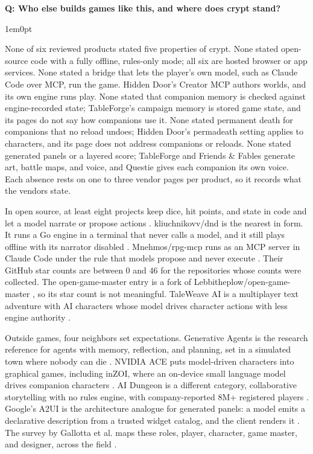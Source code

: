 \documentclass[11pt,letterpaper]{article}
\newcounter{faqnum}
\newenvironment{faqpair}[1]{%
  \needspace{4\baselineskip}\vspace{0.5em}\refstepcounter{faqnum}%
  \noindent\textbf{\color{SectionBlue}Q\thefaqnum: #1}\par\nopagebreak[4]%
  \vspace{0.2em}\begin{adjustwidth}{1em}{0pt}\setlength{\parindent}{0pt}%
}{\end{adjustwidth}\vspace{0.5em}}
\begin{document}
\begin{faqpair}{Who else builds games like this, and where does crypt stand?}
None of six reviewed products stated five properties of crypt. None stated
open-source code with a fully offline, rules-only mode; all six are hosted
browser or app services. None stated a bridge that lets the player's own
model, such as Claude Code over MCP, run the game. Hidden Door's Creator
MCP authors worlds, and its own engine runs play. None stated that
companion memory is checked against engine-recorded state; TableForge's
campaign memory is stored game state, and its pages do not say how
companions use it. None stated permanent death for companions that no
reload undoes; Hidden Door's permadeath setting applies to characters, and
its page does not address companions or reloads. None stated generated
panels or a layered score; TableForge and Friends \& Fables generate art,
battle maps, and voice, and Questie gives each companion its own voice.
Each absence rests on one to three vendor pages per product, so it records
what the vendors state.

In open source, at least eight projects keep dice, hit points, and state in
code and let a model narrate or propose actions
\cite{kliuchnikovv2026dnd,mnehmos2026rpgmcp,thegreystone2026rpgmcp,shadowgate152026dungeonmaster,slowbutfast2026opendungeon,alecvlad2026opengamemaster,datashaman2026aittrpg,undergroundrap2026aimud}.
kliuchnikovv/dnd is the nearest in form. It runs a Go engine in a terminal
that never calls a model, and it still plays offline with its narrator
disabled \cite{kliuchnikovv2026dnd}. Mnehmos/rpg-mcp runs as an MCP server
in Claude Code under the rule that models propose and never execute
\cite{mnehmos2026rpgmcp}. Their GitHub star counts are between 0 and 46
for the repositories whose counts were collected. The open-game-master
entry is a fork of Lebbitheplow/open-game-master
\cite{alecvlad2026opengamemaster}, so its star count is not meaningful. TaleWeave AI is a multiplayer text adventure with AI characters
whose model drives character actions with less engine authority
\cite{ssube2024taleweave}.

Outside games, four neighbors set expectations. Generative Agents
is the research reference for agents with memory, reflection, and planning,
set in a simulated town where nobody can die
\cite{park2023generativeagents}. NVIDIA ACE puts model-driven characters
into graphical games, including inZOI, where an on-device small language
model drives companion characters \cite{nvidia2025aceinzoi}. AI Dungeon
is a different category, collaborative storytelling with no rules engine,
with company-reported 8M+ registered players \cite{latitude2025growth}. Google's A2UI is the
architecture analogue for generated panels: a model emits a declarative
description from a trusted widget catalog, and the client renders it
\cite{google2025a2ui}. The survey by Gallotta et al. maps these roles,
player, character, game master, and designer, across the field
\cite{gallotta2024llmgames}.


\end{faqpair}
\end{document}
